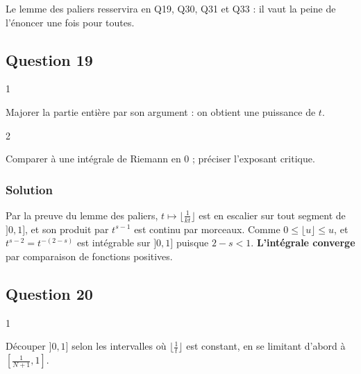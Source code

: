 \documentclass[11pt,a4paper]{article}
\newcommand{\equationajustee}[1]{%
  \sbox{\boiteequation}{$\displaystyle #1$}%
  \ifdim\wd\boiteequation>\linewidth
    \[\resizebox{\linewidth}{!}{\usebox{\boiteequation}}\]%
  \else
    \[#1\]%
  \fi}
\begin{document}
\begin{methode}

Le lemme des paliers resservira en Q19, Q30, Q31 et Q33 : il vaut la peine de l'énoncer une fois pour toutes.

\end{methode}

\hypertarget{question-19}{%
\subsection{Question 19}\label{question-19}}

\begin{indication}{1}

Majorer la partie entière par son argument : on obtient une puissance de \(t\).

\end{indication}

\begin{indication}{2}

Comparer à une intégrale de Riemann en \(0\) ; préciser l'exposant critique.

\end{indication}

\hypertarget{solution-18}{%
\subsubsection{Solution}\label{solution-18}}

Par la preuve du lemme des paliers, \(t\mapsto\lfloor\frac1{kt}\rfloor\) est en escalier sur tout segment de \(]0,1]\), et son produit par \(t^{s-1}\) est continu par morceaux. Comme \(0\leqslant\lfloor u\rfloor\leqslant u\),
\equationajustee{0\leqslant\Bigl\lfloor\frac1{kt}\Bigr\rfloor t^{s-1}\leqslant\frac1kt^{s-2},}
et \(t^{s-2}=t^{-(2-s)}\) est intégrable sur \(]0,1]\) puisque \(2-s<1\). \textbf{L'intégrale converge} par comparaison de fonctions positives.

\hypertarget{question-20}{%
\subsection{Question 20}\label{question-20}}

\begin{indication}{1}

Découper \(]0,1]\) selon les intervalles où \(\lfloor\frac1t\rfloor\) est constant, en se limitant d'abord à \([\frac1{N+1},1]\).

\end{indication}
\end{document}
